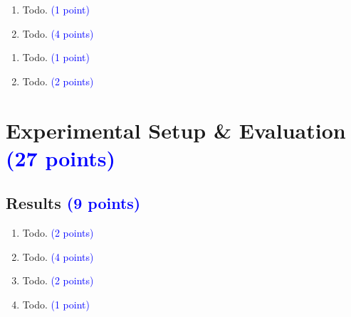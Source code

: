 \documentclass[conference]{IEEEtran}
\begin{document}

\begin{tcolorbox}[colframe=lightcarminepink, colback=lightcarminepink!5, title=Permutation equivariance \textcolor{blue}{(5 points)}, height=4cm]
\begin{enumerate}[label=\alph*)]
\item \textcolor{ashgrey}{Todo}. \textcolor{blue}{(1 point)}
\item \textcolor{ashgrey}{Todo}. \textcolor{blue}{(4 points)}
\end{enumerate}

\end{tcolorbox}


\begin{tcolorbox}[colframe=ix, colback=ix!5, title=Expressiveness \textcolor{blue}{(3 points)}, height=4cm]
\begin{enumerate}[label=\alph*)]
\item \textcolor{ashgrey}{Todo}. \textcolor{blue}{(1 point)}
\item \textcolor{ashgrey}{Todo}. \textcolor{blue}{(2 points)}
\end{enumerate}
\end{tcolorbox}


\vspace{1cm}

\section{Experimental Setup \& Evaluation \textcolor{blue}{(27 points)}}

\subsection{Results \textcolor{blue}{(9 points)}}

\begin{enumerate}[label=\alph*)]
    \item \textcolor{ashgrey}{Todo}. \textcolor{blue}{(2 points)}
    
    \item \textcolor{ashgrey}{Todo}. \textcolor{blue}{(4 points)}
    
    \item \textcolor{ashgrey}{Todo}. \textcolor{blue}{(2 points)}
    
    \item \textcolor{ashgrey}{Todo}. \textcolor{blue}{(1 point)}
\end{enumerate}
\end{document}
